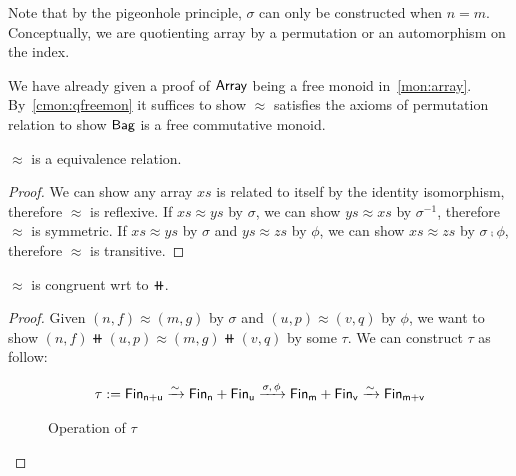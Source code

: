 Note that by the pigeonhole principle, $\sigma$ can only be constructed when $n = m$. Conceptually,
we are quotienting array by a permutation or an automorphism on the index.

We have already given a proof of $\operatorname{\mathsf{Array}}$ being a free monoid in~\ref{mon:array}.
By~\ref{cmon:qfreemon} it suffices to show $\approx$ satisfies the axioms of permutation relation
to show $\operatorname{\mathsf{Bag}}$ is a free commutative monoid.

\begin{proposition}
    $\approx$ is a equivalence relation.
\end{proposition}

\begin{proof}
    We can show any array $xs$ is related to itself by the identity isomorphism, therefore $\approx$ is reflexive.
    If $xs \approx ys$ by $\sigma$, we can show $ys \approx xs$ by $\sigma^{-1}$, therefore $\approx$ is symmetric.
    If $xs \approx ys$ by $\sigma$ and $ys \approx zs$ by $\phi$, we can show $xs \approx zs$ by $\sigma \comp \phi$,
    therefore $\approx$ is transitive.
\end{proof}

\begin{proposition}
    $\approx$ is congruent wrt to $\doubleplus$.
\end{proposition}

\begin{proof}
    Given $(n, f) \approx (m, g)$ by $\sigma$ and $(u, p) \approx (v, q)$ by $\phi$,
    we want to show $(n, f) \doubleplus (u, p) \approx (m, g) \doubleplus (v, q)$ by some $\tau$.
    We can construct $\tau$ as follow:

    \begin{align*}
        \tau := \Fin[n+u] \xto{\sim} \Fin[n] + \Fin[u] \xto{\sigma,\,\phi} \Fin[m] + \Fin[v] \xto{\sim} \Fin[m+v] \\
    \end{align*}
   
    \begin{figure}[H]
        \centering
        \vspace{-2em}
        \caption{Operation of $\tau$}
        \label{fig:enter-label}
    \end{figure}
    
\end{proof}

